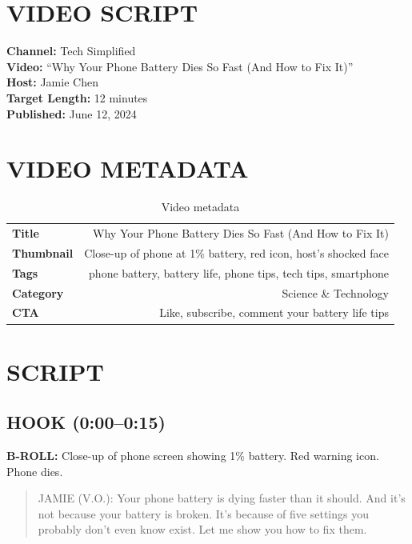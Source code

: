 \documentclass[
    language=english,
    doctype=video-script,
    institution=none,
]{../../omnilatex}
\begin{document}
\maketitle

\section*{VIDEO SCRIPT}

\textbf{Channel:} Tech Simplified\\
\textbf{Video:} ``Why Your Phone Battery Dies So Fast (And How to Fix It)''\\
\textbf{Host:} Jamie Chen\\
\textbf{Target Length:} 12 minutes\\
\textbf{Published:} June 12, 2024

\section*{VIDEO METADATA}

\begin{table}[h]
\centering
\begin{tabular}{lr}
\toprule
\textbf{Title} & Why Your Phone Battery Dies So Fast (And How to Fix It) \\
\textbf{Thumbnail} & Close-up of phone at 1\% battery, red icon, host's shocked face \\
\textbf{Tags} & phone battery, battery life, phone tips, tech tips, smartphone \\
\textbf{Category} & Science \& Technology \\
\textbf{CTA} & Like, subscribe, comment your battery life tips \\
\bottomrule
\end{tabular}
\caption{Video metadata}
\end{table}

\section*{SCRIPT}

\subsection*{HOOK (0:00--0:15)}

\textbf{B-ROLL:} Close-up of phone screen showing 1\% battery. Red warning icon. Phone dies.

\begin{quote}
JAMIE (V.O.): Your phone battery is dying faster than it should. And it's not because your battery is broken. It's because of five settings you probably don't even know exist. Let me show you how to fix them.
\end{quote}
\end{document}
